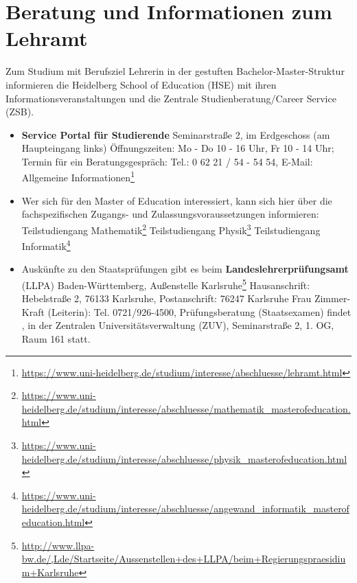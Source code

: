 \section{Beratung und Informationen zum Lehramt}
\label{lehramtkontakte}

Zum Studium mit Berufsziel Lehrerin in der gestuften Bachelor-Master-Struktur informieren die Heidelberg School of Education (HSE) mit ihren Informationsveranstaltungen und die Zentrale Studienberatung/Career Service (ZSB).
\begin{itemize}
\item \textbf{Service Portal für Studierende} \newline
    Seminarstraße 2, im Erdgeschoss (am Haupteingang links)
    Öffnungszeiten: Mo - Do 10 - 16 Uhr, Fr 10 - 14 Uhr; \newline
    Termin für ein Beratungsgespräch: Tel.: 0 62 21 / 54 - 54 54, E-Mail:  \newline
    Allgemeine Informationen\footnote{\url{https://www.uni-heidelberg.de/studium/interesse/abschluesse/lehramt.html}}

\item Wer sich für den Master of Education interessiert, kann sich hier über die fachspezifischen Zugangs- und Zulassungsvoraussetzungen informieren: \newline
    Teilstudiengang Mathematik\footnote{\url{https://www.uni-heidelberg.de/studium/interesse/abschluesse/mathematik_masterofeducation.html}} \newline
    Teilstudiengang Physik\footnote{\url{https://www.uni-heidelberg.de/studium/interesse/abschluesse/physik_masterofeducation.html}} \newline
    Teilstudiengang Informatik\footnote{\url{https://www.uni-heidelberg.de/studium/interesse/abschluesse/angewand_informatik_masterofeducation.html}}

\item Auskünfte zu den Staatsprüfungen gibt es beim \textbf{Landeslehrerprüfungsamt} (LLPA) Baden-Württemberg, Außenstelle Karlsruhe\footnote{\url{http://www.llpa-bw.de/,Lde/Startseite/Aussenstellen+des+LLPA/beim+Regierungspraesidium+Karlsruhe}} \newline
    Hausanschrift: Hebelstraße 2, 76133 Karlsruhe, Postanschrift: 76247 Karlsruhe \newline
    Frau Zimmer-Kraft (Leiterin): Tel. 0721/926-4500,  \newline
    Prüfungsberatung (Staatsexamen) findet \beratungpaedagogik, in der Zentralen Universitätsverwaltung (ZUV), Seminarstraße 2, 1. OG, Raum 161 statt.


\end{itemize}
